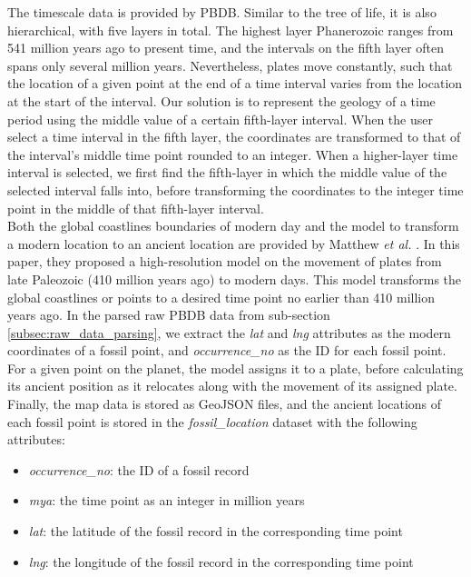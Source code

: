 \documentclass[11pt, a4paper,oneside,chapterprefix=false]{scrbook}
\begin{document}
The timescale data is provided by PBDB. Similar to the tree of life, it is also hierarchical, with five layers in total. The highest layer Phanerozoic ranges from 541 million years ago to present time, and the intervals on the fifth layer often spans only several million years. Nevertheless, plates move constantly, such that the location of a given point at the end of a time interval varies from the location at the start of the interval.  Our solution is to represent the geology of a time period using the middle value of a certain fifth-layer interval. When the user select a time interval in the fifth layer, the coordinates are transformed to that of the interval's middle time point rounded to an integer. When a higher-layer time interval is selected, we first find the fifth-layer in which the middle value of the selected interval falls into, before transforming the coordinates to the integer time point in the middle of that fifth-layer interval. \\

Both the global coastlines boundaries of modern day and the model to transform a modern location to an ancient location are provided by Matthew \emph{et al.} \cite{matthews2016global}. In this paper, they proposed a high-resolution model on the movement of plates from late Paleozoic (410 million years ago) to modern days. This model transforms the global coastlines or points to a desired time point no earlier than 410 million years ago.  In the parsed raw PBDB data from sub-section \ref{subsec:raw_data_parsing}, we extract the \emph{lat} and \emph{lng} attributes as the modern coordinates of a fossil point, and \emph{occurrence\_no} as the ID for each fossil point. For a given point on the planet, the model assigns it to a plate, before calculating its ancient position as it relocates along with the movement of its assigned plate. Finally, the map data is stored as GeoJSON files, and the ancient locations of each fossil point is stored in the \emph{fossil\_location} dataset with the following attributes: \\

\begin{itemize}
	\item \textit{occurrence\_no}: the ID of a fossil record
	\item \textit{mya}: the time point as an integer in million years
	\item \textit{lat}: the latitude of the fossil record in the corresponding time point
	\item \textit{lng}: the longitude of the fossil record in the corresponding time point
\end{itemize}
\end{document}
